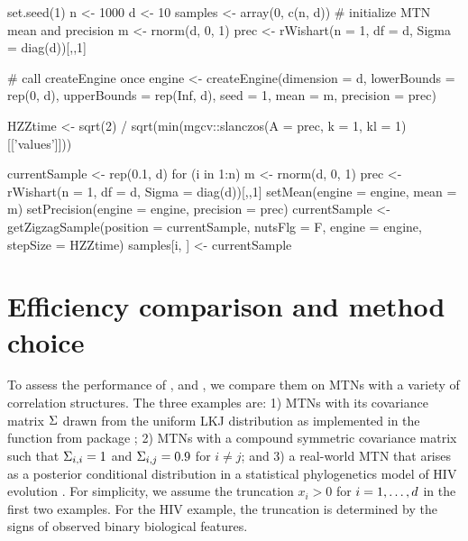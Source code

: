 \begin{example}
set.seed(1)
n <- 1000 
d <- 10
samples <- array(0, c(n, d))
# initialize MTN mean and precision
m <- rnorm(d, 0, 1)
prec <- rWishart(n = 1, df = d, Sigma = diag(d))[,,1]

# call createEngine once
engine <- createEngine(dimension = d, lowerBounds = rep(0, d),
upperBounds = rep(Inf, d), seed = 1, mean = m, precision = prec)

HZZtime <- sqrt(2) / sqrt(min(mgcv::slanczos(A = prec, k = 1, 
			  kl = 1)[['values']]))

currentSample <- rep(0.1, d)
for (i in 1:n) {
   m <- rnorm(d, 0, 1)
   prec <- rWishart(n = 1, df = d, Sigma = diag(d))[,,1]
   setMean(engine = engine, mean = m)
   setPrecision(engine = engine, precision = prec)
   currentSample <- getZigzagSample(position = currentSample, nutsFlg = F,
	   		         engine = engine, stepSize = HZZtime)
   samples[i, ] <- currentSample
}
\end{example}

\section{Efficiency comparison and method choice}
\label{sec:efficiency_comparison}
To assess the performance of \hhmc, \zhmc and \mt, we compare them on MTNs with a variety of correlation structures. 
The three examples are: 1) MTNs with its covariance matrix $ \Sigma $ drawn from the uniform LKJ distribution \citep{lewandowski2009generating} as implemented in the  function from package  \citep{trialrpkg};
2) MTNs with a compound symmetric covariance matrix such that $ \Sigma_{i,i} = 1 $ and $ \Sigma_{i,j} =  0.9 $ for $ i \neq j $; and
3) a real-world MTN that arises as a posterior conditional distribution in a statistical phylogenetics model of HIV evolution \citep{zhang2021large, zhang2023accelerating}.
For simplicity, we assume the truncation $ x_i > 0 $ for $ i = 1, \dots, d$ in the first two examples.
For the HIV example, the truncation is determined by the signs of observed binary biological features.


